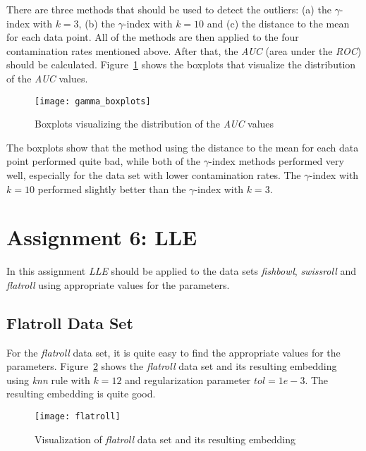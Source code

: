 There are three methods that should be used to detect the outliers: (a) the $\gamma$-index with $k=3$, (b) the $\gamma$-index with $k=10$ and (c) the distance to the mean for each data point. All of the methods are then applied to the four contamination rates mentioned above. After that, the \textit{AUC} (area under the \textit{ROC}) should be calculated. Figure~\ref{fig:gammaboxplots} shows the boxplots that visualize the distribution of the \textit{AUC} values.

\begin{figure}[h!]
	\centering
	\texttt{[image: gamma\_boxplots]}
	\caption{Boxplots visualizing the distribution of the \textit{AUC} values}
	\label{fig:gammaboxplots}
\end{figure}

The boxplots show that the method using the distance to the mean for each data point performed quite bad, while both of the $\gamma$-index methods performed very well, especially for the data set with lower contamination rates. The $\gamma$-index with $k=10$ performed slightly better than the $\gamma$-index with $k=3$.



\section{Assignment 6: LLE}
\label{assignment6}

In this assignment \textit{LLE} should be applied to the data sets \textit{fishbowl}, \textit{swissroll} and \textit{flatroll} using appropriate values for the parameters.

\subsection{Flatroll Data Set}
\label{ass6:flatroll}

For the \textit{flatroll} data set, it is quite easy to find the appropriate values for the parameters. Figure~\ref{fig:lleflatroll} shows the \textit{flatroll} data set and its resulting embedding using \textit{knn} rule with $k=12$ and regularization parameter $tol=1e-3$. The resulting embedding is quite good.

\begin{figure}[h!]
	\centering
	\texttt{[image: flatroll]}
	\caption{Visualization of \textit{flatroll} data set and its resulting embedding}
	\label{fig:lleflatroll}
\end{figure}

